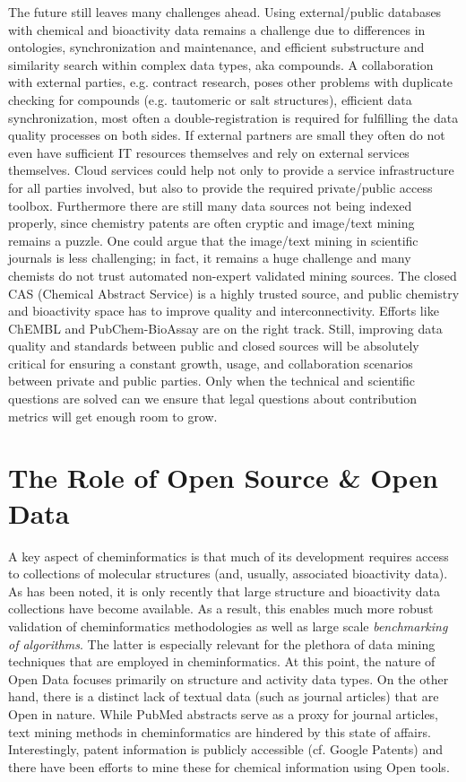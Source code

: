 \documentclass{sig-alternate}
\begin{document}
The future still leaves many challenges ahead. Using external/public databases
with chemical and bioactivity data remains a challenge due to differences in
ontologies, synchronization and maintenance, and efficient
substructure and similarity search within complex data types, aka compounds. A
collaboration with external parties, e.g. contract research, poses other
problems with duplicate checking for compounds (e.g. tautomeric or salt
structures), efficient data synchronization, most often a double-registration is
required for fulfilling the data quality processes on both sides. If external
partners are small they often do not even have sufficient IT resources
themselves and rely on external services themselves. Cloud services could help
not only to provide a service infrastructure for all parties involved,
but also to provide the required private/public access toolbox. Furthermore
there are still many data sources not being indexed properly, since chemistry
patents are often cryptic and image/text mining remains a puzzle. One could
argue that the image/text mining in scientific journals is less challenging; in
fact, it remains a huge challenge and many chemists do not trust automated
non-expert validated mining sources. The closed CAS (Chemical Abstract Service)
is a highly trusted source, and public chemistry and bioactivity space has to
improve quality and interconnectivity. Efforts like ChEMBL and PubChem-BioAssay
are on the right track. Still, improving data quality and standards between
public and closed sources will be absolutely critical for ensuring a constant
growth, usage, and collaboration scenarios between private and public parties.
Only when the technical and scientific questions are solved can we ensure that
legal questions about contribution metrics will get enough room to grow.

\section{The Role of Open Source \& Open Data}
\label{sec:role-open-source}

A key aspect of cheminformatics is that much of its development
requires access to collections of molecular structures (and, usually,
associated bioactivity data). As has been noted, it is only recently
that large structure and bioactivity data collections have become
available. As a result, this enables much more robust validation of
cheminformatics methodologies as well as large scale \emph{benchmarking of
algorithms}. The latter is especially relevant for the plethora of
data mining techniques that are employed in cheminformatics. At this
point, the nature of Open Data focuses primarily on structure and
activity data types. On the other hand, there is a distinct lack of
textual data (such as journal articles) that are Open in nature. While
PubMed abstracts serve as a proxy for journal articles, text mining
methods in cheminformatics are hindered by this state of affairs.
Interestingly, patent information is publicly accessible (cf. Google
Patents) and there have been efforts to mine these for chemical
information using Open tools.
\end{document}
